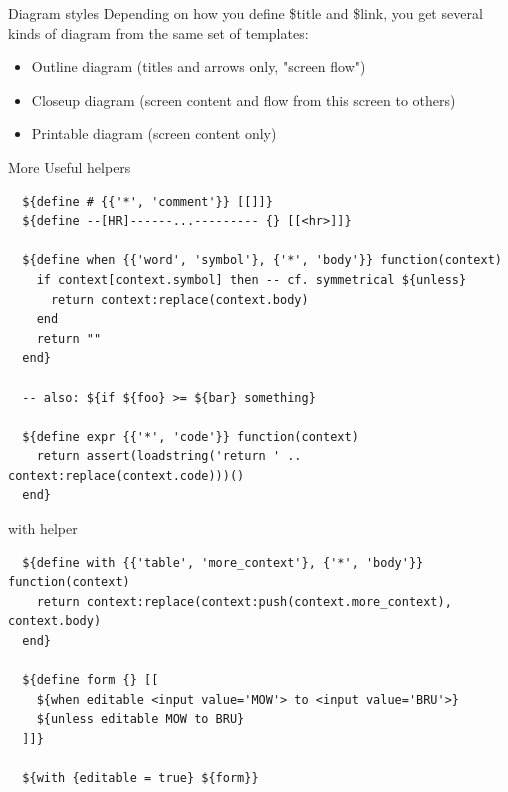 \documentclass[aspectratio=43,handout,bigger]{beamer}
\begin{document}
\begin{frame}{Diagram styles}
  Depending on how you define \${title} and \${link},
  you get several kinds of diagram from the same set of templates:

  \begin{itemize}
    \item Outline diagram (titles and arrows only, "screen flow")
    \item Closeup diagram (screen content and flow from this screen to others)
    \item Printable diagram (screen content only)
  \end{itemize}
\end{frame}


\begin{frame}[fragile]{More Useful helpers}
\begin{verbatim}
  ${define # {{'*', 'comment'}} [[]]}
  ${define --[HR]------...--------- {} [[<hr>]]}

  ${define when {{'word', 'symbol'}, {'*', 'body'}} function(context)
    if context[context.symbol] then -- cf. symmetrical ${unless}
      return context:replace(context.body)
    end
    return ""
  end}

  -- also: ${if ${foo} >= ${bar} something}

  ${define expr {{'*', 'code'}} function(context)
    return assert(loadstring('return ' .. context:replace(context.code)))()
  end}
\end{verbatim}
\end{frame}


\begin{frame}[fragile]{with helper}
\begin{verbatim}
  ${define with {{'table', 'more_context'}, {'*', 'body'}} function(context)
    return context:replace(context:push(context.more_context), context.body)
  end}

  ${define form {} [[
    ${when editable <input value='MOW'> to <input value='BRU'>}
    ${unless editable MOW to BRU}
  ]]}

  ${with {editable = true} ${form}}
\end{verbatim}
\end{frame}

\end{document}
